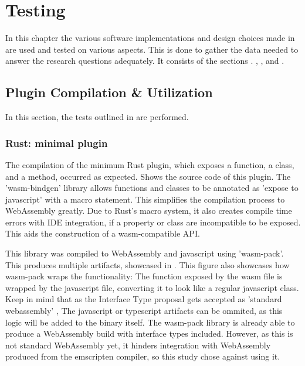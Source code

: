 \chapter{Testing}%
\label{chap:testing}

In this chapter the various software implementations and design choices made in  are used and tested on various aspects. 
This is done to gather the data needed to answer the research questions adequately.
It consists of the sections . , , and .


\section{Plugin Compilation \& Utilization}
\label{sec:testing:compilation}

In this section, the tests outlined in  are performed. 

\subsection{Rust: minimal plugin}

\graphicspath{{../../assets/images/6.1.1/}}

The compilation of the minimum Rust plugin, which exposes a function, a class, and a method, occurred as expected.   
 Shows the source code of this plugin. 
The 'wasm-bindgen' library allows functions and classes to be annotated as 'expose to javascript' with a macro statement. 
This simplifies the compilation process to WebAssembly greatly. 
Due to Rust's macro system, it also creates compile time errors with IDE integration, if a property or class are incompatible to be exposed. 
This aids the construction of a wasm-compatible API. 

This library was compiled to WebAssembly and javascript using 'wasm-pack'. 
This produces multiple artifacts, showcased in . 
This figure also showcases how wasm-pack wraps the functionality: 
The  function exposed by the wasm file is wrapped by the javascript file, converting it to look like a regular javascript class.
Keep in mind that as the Interface Type proposal gets accepted as 'standard webassembly' \citep*{wagner_interface_2022}, The javascript or typescript artifacts can be ommited, as this logic will be added to the  binary itself.
The wasm-pack library is already able to produce a WebAssembly build with interface types included. 
However, as this is not standard WebAssembly yet, it hinders integration with WebAssembly produced from the emscripten compiler, so this study chose against using it.

